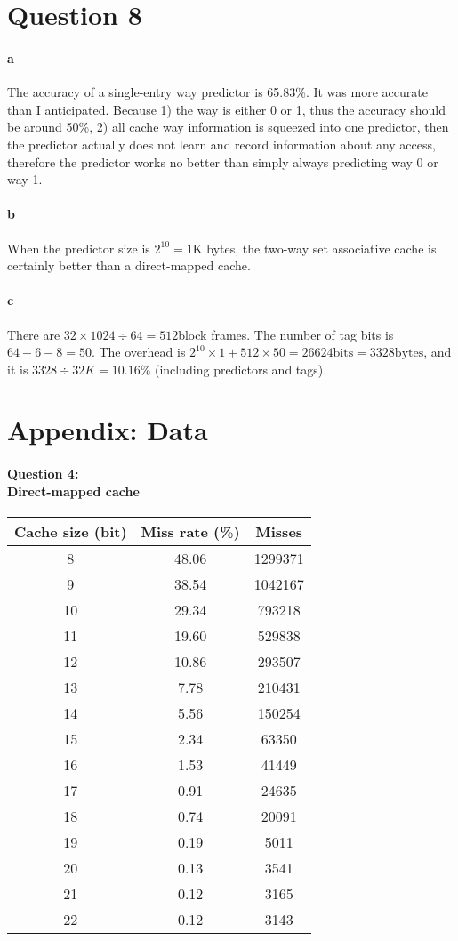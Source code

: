 \documentclass[12pt,letterpaper]{article}
\begin{document}
\section*{Question 8}
\paragraph*{a}
The accuracy of a single-entry way predictor is 65.83\%. It was more accurate than I anticipated.
Because 1) the way is either 0 or 1, thus the accuracy should be around 50\%, 2) all cache way 
information is squeezed into one predictor, then the predictor actually does not learn and 
record information about any access, therefore the predictor works no better than simply
always predicting way 0 or way 1.
\paragraph*{b}
When the predictor size is $2^{10}=1$K bytes, the two-way set associative cache is certainly
better than a direct-mapped cache.
\paragraph*{c}
There are $32\times1024\div64=512$block frames. The number of tag bits is $64-6-8=50$. 
The overhead is $2^{10}\times1+512\times50=26624\mbox{bits}=3328\mbox{bytes}$, and it 
is $3328\div32K=10.16\%$ (including predictors and tags).

\section*{Appendix: Data}
\paragraph*{Question 4:\\Direct-mapped cache}
\begin{tabular}{|c|c|c|}
\hline 
Cache size (bit) & Miss rate (\%) & Misses \\ 
\hline 
8 & 48.06 & 1299371 \\ 
\hline 
9 & 38.54 & 1042167 \\ 
\hline 
10 & 29.34 & 793218 \\ 
\hline 
11 & 19.60 & 529838 \\ 
\hline 
12 & 10.86 & 293507 \\ 
\hline 
13 & 7.78 & 210431 \\ 
\hline 
14 & 5.56 & 150254 \\ 
\hline 
15 & 2.34 & 63350 \\ 
\hline 
16 & 1.53 & 41449 \\ 
\hline 
17 & 0.91 & 24635 \\ 
\hline 
18 & 0.74 & 20091 \\ 
\hline 
19 & 0.19 & 5011 \\ 
\hline 
20 & 0.13 & 3541 \\ 
\hline 
21 & 0.12 & 3165 \\ 
\hline 
22 & 0.12 & 3143 \\ 
\hline 
\end{tabular} 
\end{document}
